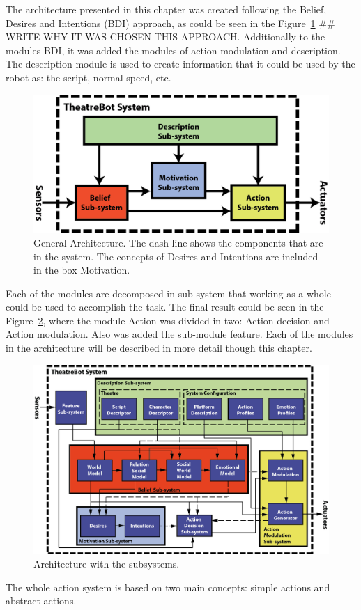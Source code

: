 The architecture presented in this chapter was created following the Belief, Desires and Intentions (BDI) approach, as could be seen in the Figure~\ref{fig:GeneralArchitecture} ## WRITE WHY IT WAS CHOSEN THIS APPROACH. Additionally to the modules BDI, it was added the modules of action modulation and description. The description module is used to create information that it could be used by the robot as: the script, normal speed, etc.
\begin{figure}
	\centering
	\includegraphics[width=1.0\textwidth]{./Images/Architecture/GeneralArchitecture.png} 
	\caption{General Architecture. The dash line shows the components that are in the system. The concepts of Desires and Intentions are included in the box Motivation.}
	\label{fig:GeneralArchitecture}
\end{figure}
Each of the modules are decomposed in sub-system that working as a whole could be used to accomplish the task. The final result could be seen in the Figure~\ref{fig:ArchitectureWithSubSystems}, where the module Action was divided in two: Action decision and Action modulation. Also was added the sub-module feature. Each of the modules in the architecture will be described in more detail though this chapter. 
\begin{figure}
	\centering
	\includegraphics[width=1.0\textwidth]{./Images/Architecture/ArchitectureNew.png} 
	\caption{Architecture with the subsystems.}
	\label{fig:ArchitectureWithSubSystems}
\end{figure}
The whole action system is based on two main concepts: simple actions and abstract actions.
